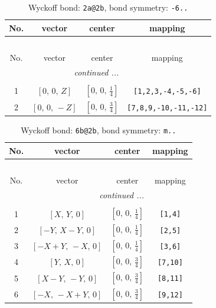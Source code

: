 \documentclass[fleqn,8pt]{jsarticle}
\begin{document}
\begin{longtable}{cccc}
\caption{Wyckoff bond: {\tt 2a@2b}, bond symmetry: {\tt -6..}}
 \\
 \hline \hline
No. & vector & center & mapping \\ \hline \endfirsthead

\multicolumn{3}{l}{\tablename\ \thetable{}} \\
 \hline \hline
No. & vector & center & mapping \\ \hline \endhead

 \hline \hline
\multicolumn{3}{r}{\footnotesize\it continued ...} \\ \endfoot

 \hline \hline
\multicolumn{3}{r}{} \\ \endlastfoot

1 & $\left[ 0,\, 0,\, Z \right]$ & $\left[ 0,\, 0,\, \frac{1}{4} \right]$ & {\tt [1,2,3,-4,-5,-6]} \\ \hline
2 & $\left[ 0,\, 0,\, - Z \right]$ & $\left[ 0,\, 0,\, \frac{3}{4} \right]$ & {\tt [7,8,9,-10,-11,-12]} \\
\end{longtable}
\renewcommand{\arraystretch}{1.2}
\begin{longtable}{cccc}
\caption{Wyckoff bond: {\tt 6b@2b}, bond symmetry: {\tt m..}}
 \\
 \hline \hline
No. & vector & center & mapping \\ \hline \endfirsthead

\multicolumn{3}{l}{\tablename\ \thetable{}} \\
 \hline \hline
No. & vector & center & mapping \\ \hline \endhead

 \hline \hline
\multicolumn{3}{r}{\footnotesize\it continued ...} \\ \endfoot

 \hline \hline
\multicolumn{3}{r}{} \\ \endlastfoot

1 & $\left[ X,\, Y,\, 0 \right]$ & $\left[ 0,\, 0,\, \frac{1}{4} \right]$ & {\tt [1,4]} \\ \hline
2 & $\left[ - Y,\, X - Y,\, 0 \right]$ & $\left[ 0,\, 0,\, \frac{1}{4} \right]$ & {\tt [2,5]} \\ \hline
3 & $\left[ - X + Y,\, - X,\, 0 \right]$ & $\left[ 0,\, 0,\, \frac{1}{4} \right]$ & {\tt [3,6]} \\ \hline
4 & $\left[ Y,\, X,\, 0 \right]$ & $\left[ 0,\, 0,\, \frac{3}{4} \right]$ & {\tt [7,10]} \\ \hline
5 & $\left[ X - Y,\, - Y,\, 0 \right]$ & $\left[ 0,\, 0,\, \frac{3}{4} \right]$ & {\tt [8,11]} \\ \hline
6 & $\left[ - X,\, - X + Y,\, 0 \right]$ & $\left[ 0,\, 0,\, \frac{3}{4} \right]$ & {\tt [9,12]} \\
\end{longtable}
\end{document}
